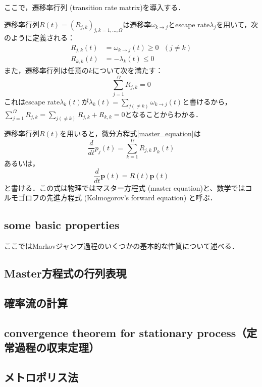 ここで，遷移率行列 (transition rate matrix)を導入する．
\begin{kotak}
	\begin{definition}
	遷移率行列$R(t)=(R_{j,k})_{j,k=1,\ldots,\Omega}$は遷移率$\omega_{k\to j}$とescape rate$\lambda_j$を用いて，次のように定義される：
	\begin{align}
	    R_{j,k}(t) &= \omega_{k\to j}(t) \geq 0\ \ \ (j\neq k)\\[10pt]
	    R_{k,k}(t) &= -\lambda_{k}(t) \leq 0
	\end{align}
	また，遷移率行列は任意の$k$について次を満たす：
	\begin{equation}
	    \sum_{j=1}^{\Omega}R_{j,k} = 0
	\end{equation}
	これはescape rate$\lambda_k(t)$が$\lambda_k(t) = \sum_{j(\neq k)}\omega_{k\to j}(t)$と書けるから，$\sum_{j=1}^{\Omega}R_{j,k} =\sum_{j(\neq k)}R_{j,k} + R_{k,k} = 0$となることからわかる．
	\end{definition}
\end{kotak}
遷移率行列$R(t)$を用いると，微分方程式\eqref{master_equation}は
\begin{equation}
    \frac{d}{dt}p_j(t)
    = \sum_{k = 1}^{\Omega}R_{j,k}\ p_{k}(t)
\end{equation}
あるいは，
\begin{equation}
    \frac{d}{dt}\bm{p}(t)
    = R(t) \bm{p}(t)
\end{equation}
と書ける．この式は物理ではマスター方程式 (master equation)と、数学ではコルモゴロフの先進方程式 (Kolmogorov's forward equation) と呼ぶ．
\subsection{some basic properties}
ここではMarkovジャンプ過程のいくつかの基本的な性質について述べる．
\subsection{Master方程式の行列表現}

\subsection{確率流の計算}

\subsection{convergence theorem for stationary process（定常過程の収束定理）}

\subsection{メトロポリス法}